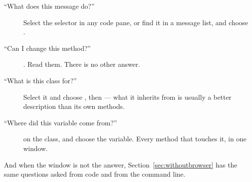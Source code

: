 \begin{description}
\item[``What does this message do?''] Select the selector in any code pane,
  or find it in a message list, and choose .
\item[``Can I change this method?''] . Read them. There is no
  other answer.
\item[``What is this class for?''] Select it and choose , then
   --- what it inherits from is usually a better description
  than its own methods.
\item[``Where did this variable come from?'']  on the
  class, and choose the variable. Every method that touches it, in one window.
\end{description}

And when the window is not the answer, Section~\ref{sec:withoutbrowser} has
the same questions asked from code and from the command line.

